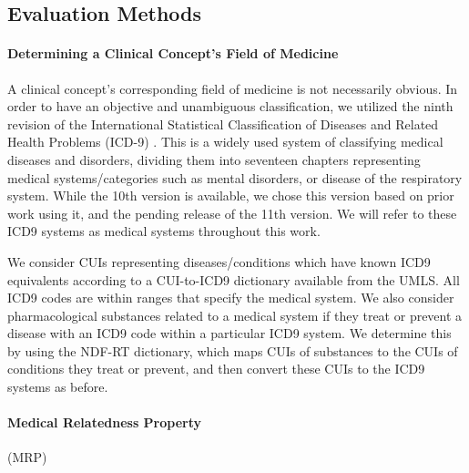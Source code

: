 \documentclass[11pt,a4paper]{article}
\begin{document}


\subsection{Evaluation Methods}

\paragraph{Determining a Clinical Concept's Field of Medicine}
A clinical concept's corresponding field of medicine is not necessarily obvious. In order to have an objective and unambiguous classification, we utilized the ninth revision of the International Statistical Classification of Diseases and Related Health Problems (ICD-9) \cite{sleeInternationalClassificationDiseases1978}. This is a widely used system of classifying medical diseases and disorders, dividing them into seventeen chapters representing medical systems/categories such as mental disorders, or disease of the respiratory system. While the 10th version is available, we chose this version based on prior work using it, and the pending release of the 11th version. We will refer to these ICD9 systems as medical systems throughout this work. 

We consider CUIs representing diseases/conditions which have known ICD9 equivalents according to a CUI-to-ICD9 dictionary available from the UMLS. All ICD9 codes are within ranges that specify the medical system. We also consider pharmacological substances related to a medical system if they treat or prevent a disease with an ICD9 code within a particular ICD9 system. We determine this by using the NDF-RT dictionary, which maps CUIs of substances to the CUIs of conditions they treat or prevent, and then convert these CUIs to the ICD9 systems as before.  

\paragraph{Medical Relatedness Property}(MRP)
\end{document}
